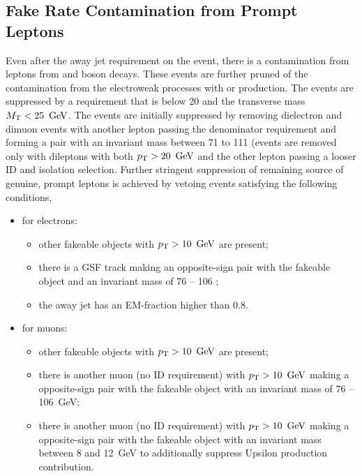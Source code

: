 \subsection{Fake Rate Contamination from Prompt Leptons}
\label {sec:bkgd_fakes_lepcont}
Even after the away jet requirement on the event, there is a contamination
from leptons from \W and \Z boson decays. These events are further pruned of
the contamination from the electroweak processes with \W or \Z production.
The \W events are suppressed by a requirement that \met is below 20 \GeV and
the transverse mass $M_{\mathrm{T}} < 25~\,\text{Ge\hspace{-.08em}V}$. The \Z events are initially suppressed
by removing dielectron and dimuon events with another lepton passing the
denominator requirement and forming a pair with an invariant mass between 71 to
111 \GeV (events are removed only with dileptons with both $p_{\mathrm{T}} > 20~\,\text{Ge\hspace{-.08em}V}$ and
the other lepton passing a looser ID and isolation selection. Further stringent
suppression of remaining source of genuine, prompt leptons is achieved by
vetoing events satisfying the following conditions,

\begin{itemize}
\item for electrons:
\begin{itemize}
\item other fakeable objects with $\pt>10\ \GeV$ are present;
\item there is a GSF track making an opposite-sign pair with the fakeable
object and an invariant mass of 76 -- 106 \GeV;
\item the away jet has an EM-fraction higher than 0.8. 
\end{itemize}
\item for muons:
\begin{itemize}
\item other fakeable objects with $p_{\mathrm{T}}>10~\,\text{Ge\hspace{-.08em}V}$ are present;
\item there is another muon (no ID requirement) with $p_{\mathrm{T}}>10~\,\text{Ge\hspace{-.08em}V}$ making a
opposite-sign pair with the fakeable object with an invariant mass of 76 --
106~GeV;
\item there is another muon (no ID requirement) with $p_{\mathrm{T}}>10~\,\text{Ge\hspace{-.08em}V}$ making a
opposite-sign pair with the fakeable object with an invariant mass between 8
and 12~GeV to additionally suppress Upsilon production contribution.
\end{itemize}
\end{itemize}

